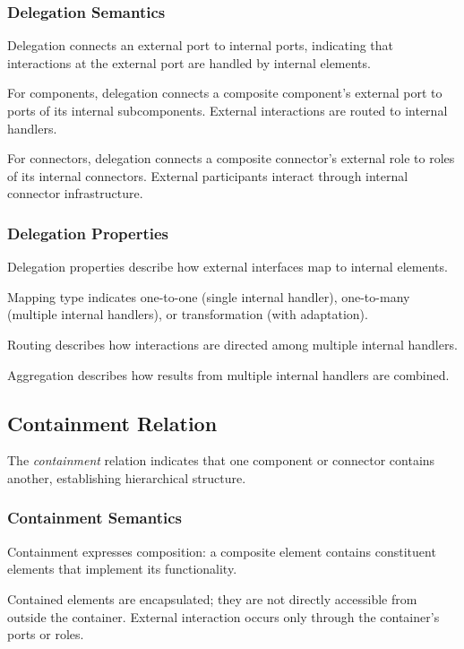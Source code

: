 \documentclass[11pt]{article}
\begin{document}
\subsubsection{Delegation Semantics}

Delegation connects an external port to internal ports, indicating that interactions at the external port are handled by internal elements.

For components, delegation connects a composite component's external port to ports of its internal subcomponents. External interactions are routed to internal handlers.

For connectors, delegation connects a composite connector's external role to roles of its internal connectors. External participants interact through internal connector infrastructure.

\subsubsection{Delegation Properties}

Delegation properties describe how external interfaces map to internal elements.

Mapping type indicates one-to-one (single internal handler), one-to-many (multiple internal handlers), or transformation (with adaptation).

Routing describes how interactions are directed among multiple internal handlers.

Aggregation describes how results from multiple internal handlers are combined.

\subsection{Containment Relation}

The \textit{containment} relation indicates that one component or connector contains another, establishing hierarchical structure.

\subsubsection{Containment Semantics}

Containment expresses composition: a composite element contains constituent elements that implement its functionality.

Contained elements are encapsulated; they are not directly accessible from outside the container. External interaction occurs only through the container's ports or roles.
\end{document}
